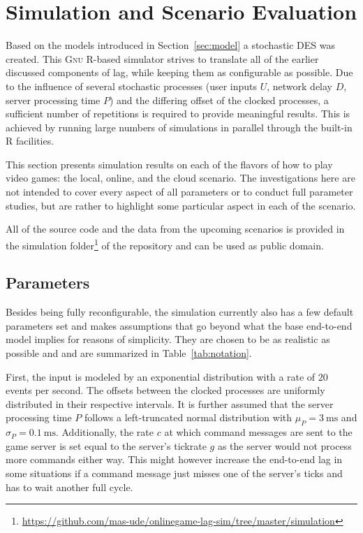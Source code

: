 \section{Simulation and Scenario Evaluation}
\label{sec:simulation}

Based on the models introduced in Section~\ref{sec:model} a stochastic 
\gls{DES} was created. This 
\textsc{Gnu R}-based simulator strives to translate all of the earlier 
discussed components of lag, while keeping them as configurable as possible.
Due to the influence of several stochastic processes (user inputs $U$, network delay $D$, server processing time $P$) and the differing offset of the clocked processes, a sufficient number of repetitions is required to provide meaningful results. This is achieved by running large numbers of simulations 
in parallel through the built-in R facilities.

This section presents simulation results on each of the flavors of how to play video games: the local, online, and the cloud scenario.
The investigations here are not intended to cover every aspect of all parameters or to conduct full parameter studies, but are rather to highlight some particular aspect in each of the scenario. 

All of the source code and the data from the upcoming scenarios is provided in the simulation folder\footnote{\url{https://github.com/mas-ude/onlinegame-lag-sim/tree/master/simulation}} of the repository and can be used as public domain.


\subsection{Parameters}

Besides being fully reconfigurable, the simulation currently also has a few default parameters set and makes assumptions that go beyond what the base end-to-end model implies for reasons of simplicity. They are chosen to be as realistic as possible and and are summarized in Table~\ref{tab:notation}.

First, the input is modeled by an exponential distribution with a rate of $20$ events per second. The offsets between the clocked processes are uniformly distributed in their respective intervals. It is further assumed that the server processing time $P$ follows a left-truncated normal distribution with $\mu_P = \SI{3}{\milli\second}$ and $\sigma_P = \SI{0.1}{\milli\second}$.
Additionally, the rate $c$ at which command messages are sent to the game server is set equal to the server's tickrate $g$ as the server would not process more commands either way. This might however increase the end-to-end lag in some situations if a command message just misses one of the server's ticks and has to wait another full cycle.

